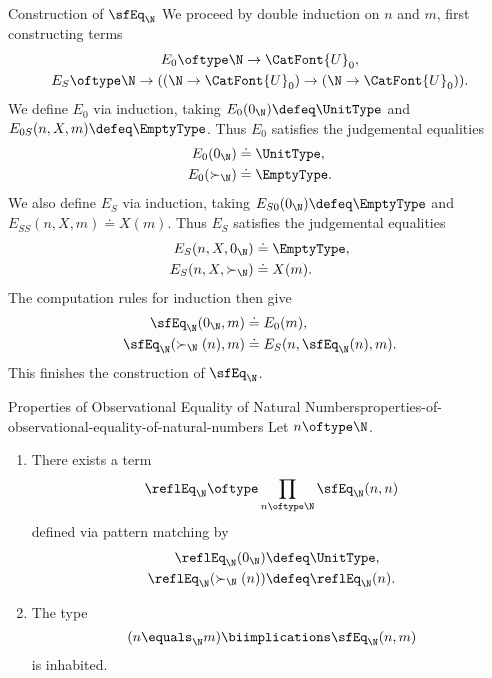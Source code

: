 \begin{Proof}{Construction of $\sfEq_{\N}$}%
    We proceed by double induction on $n$ and $m$, first constructing terms
    \begin{gather*}
        E_{0} \oftype \N\to\CatFont{U}_{0},\\
        E_{S} \oftype \N\to((\N\to\CatFont{U}_{0})\to(\N\to\CatFont{U}_{0})).%
    \end{gather*}
    We define $E_{0}$ via induction, taking $E_{0}(0_{\N})\defeq\UnitType$ and $E_{0S}(n,X,m)\defeq\EmptyType$. Thus $E_{0}$ satisfies the judgemental equalities
    \begin{align*}
        E_{0}(0_{\N})     &\doteq \UnitType,\\%
        E_{0}(\succ_{\N}) &\doteq \EmptyType.%
    \end{align*}
    We also define $E_{S}$ via induction, taking $E_{S0}(0_{\N})\defeq\EmptyType$ and $E_{SS}(n,X,m)\doteq X(m)$. Thus $E_{S}$ satisfies the judgemental equalities
    \begin{align*}
        E_{S}(n,X,0_{\N})     &\doteq \EmptyType,\\%
        E_{S}(n,X,\succ_{\N}) &\doteq X(m).%
    \end{align*}
    The computation rules for induction then give
    \begin{align*}
        \sfEq_{\N}(0_{\N},m)        &\doteq E_{0}(m),\\%
        \sfEq_{\N}(\succ_{\N}(n),m) &\doteq E_{S}(n,\sfEq_{\N}(n),m).%
    \end{align*}
    This finishes the construction of $\sfEq_{\N}$.
\end{Proof}
\begin{proposition}{Properties of Observational Equality of Natural Numbers}{properties-of-observational-equality-of-natural-numbers}%
    Let $n\oftype\N$.
    \begin{enumerate}
        \item\label{properties-of-observational-equality-of-natural-numbers-reflexivity}There exists a term
            \[
                \reflEq_{\N}%
                \oftype%
                \prod_{n\oftype\N}\sfEq_{\N}(n,n)%
            \]%
            defined via pattern matching by
            \begin{align*}
                \reflEq_{\N}(0_{\N})        &\defeq \UnitType,\\%
                \reflEq_{\N}(\succ_{\N}(n)) &\defeq \reflEq_{\N}(n).%
            \end{align*}
        \item\label{properties-of-observational-equality-of-natural-numbers-relation-to-identity-types}The type
            \[
                (n\equals_{\N}m)%
                \biimplications%
                \sfEq_{\N}(n,m)%
            \]%
            is inhabited.
    \end{enumerate}
\end{proposition}
